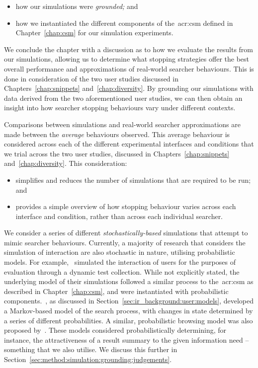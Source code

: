 \begin{itemize}
    \item{how our simulations were \emph{grounded;} and}
    \item{how we instantiated the different components of the~\gls{acr:csm} defined in Chapter~\ref{chap:csm} for our simulation experiments.}
\end{itemize}

We conclude the chapter with a discussion as to how we evaluate the results from our simulations, allowing us to determine what stopping strategies offer the best overall performance and approximations of real-world searcher behaviours. This is done in consideration of the two user studies discussed in Chapters~\ref{chap:snippets} and~\ref{chap:diversity}. By grounding our simulations with data derived from the two aforementioned user studies, we can then obtain an insight into how searcher stopping behaviours vary under different contexts.

 Comparisons between simulations and real-world searcher approximations are made between the \emph{average} behaviours observed. This average behaviour is considered across each of the different experimental interfaces and conditions that we trial across the two user studies, discussed in Chapters~\ref{chap:snippets} and~\ref{chap:diversity}. This consideration:

\begin{itemize}
    \item{simplifies and reduces the number of simulations that are required to be run; and}
    \item{provides a simple overview of how stopping behaviour varies across each interface and condition, rather than across each individual searcher.}
\end{itemize}

 We consider a series of different \emph{stochastically-based} simulations that attempt to mimic searcher behaviours. Currently, a majority of research that considers the simulation of interaction are also stochastic in nature, utilising probabilistic models. For example,~\cite{carterette2011effectiveness_evaluation} simulated the interaction of users for the purposes of evaluation through a dynamic test collection. While not explicitly stated, the underlying model of their simulations followed a similar process to the~\gls{acr:csm} as described in Chapter~\ref{chap:csm}, and were instantiated with probabilistic components.~\cite{baskaya2013behavioural_factors}, as discussed in Section~\ref{sec:ir_background:user:models}, developed a Markov-based model of the search process, with changes in state determined by a series of different probabilities. A similar, probabilistic browsing model was also proposed by~\cite{yilmaz2010browsing_utility}. These models considered probabilistically determining, for instance, the attractiveness of a result summary to the given information need -- something that we also utilise. We discuss this further in Section~\ref{sec:method:simulation:grounding:judgements}.

